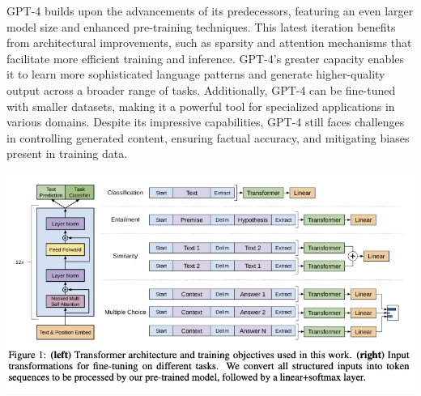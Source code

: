 GPT-4 builds upon the advancements of its predecessors, featuring an even larger model size and enhanced pre-training techniques. This latest iteration benefits from architectural improvements, such as sparsity and attention mechanisms that facilitate more efficient training and inference. GPT-4's greater capacity enables it to learn more sophisticated language patterns and generate higher-quality output across a broader range of tasks. Additionally, GPT-4 can be fine-tuned with smaller datasets, making it a powerful tool for specialized applications in various domains. Despite its impressive capabilities, GPT-4 still faces challenges in controlling generated content, ensuring factual accuracy, and mitigating biases present in training data.

\includegraphics[width=1\linewidth]{img//rnn//transformers/cleanshot-2023-04-16-at-23.39.34.jpeg}

